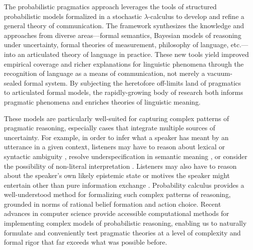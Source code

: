 \documentclass{sp}
\newcommand{\gcs}[1]{\textcolor{blue}{[gcs: #1]}}
\begin{document}
The probabilistic pragmatics approach leverages the tools of structured probabilistic models formalized in a stochastic $\lambda$-calculus to develop and refine a general theory of communication. The framework synthesizes the knowledge and approaches from diverse areas---formal semantics, Bayesian models of reasoning under uncertainty, formal theories of measurement, philosophy of language, etc.---into an articulated theory of language in practice. These new tools yield improved empirical coverage and richer explanations for linguistic phenomena through the recognition of language as a means of communication, not merely a vacuum-sealed formal system. By subjecting the heretofore off-limits land of pragmatics to articulated formal models, the rapidly-growing body of research both informs pragmatic phenomena and enriches theories of linguistic meaning.


These models are particularly well-suited for capturing complex patterns of pragmatic reasoning, especially cases that integrate multiple sources of uncertainty. For example, in order to infer what a speaker has meant by an utterance in a given context, listeners may have to reason about lexical or syntactic ambiguity \citep{bergenetal2016,savinellietal2017,FrankeBergen2020:Theory-driven-s}, resolve underspecification in semantic meaning \citep{lassitergoodman2013}, or consider the possibility of non-literal interpretation \citep{kaoetal2014metaphor,kaoetal2014}. Listeners may also have to reason about the speaker's own likely epistemic state \citep{goodmanstuhlmuller2013,scontrasgoodman2017,HerbstrittFranke2019:Complex-probabi} or motives the speaker might entertain other than pure information exchange \citep{yoonetal2016,yoonetal2017}. Probability calculus provides a well-understood method for formalizing such complex patterns of reasoning, grounded in norms of rational belief formation and action choice. Recent advances in computer science provide accessible computational methods for implementing complex models of probabilistic reasoning, enabling us to naturally formulate and conveniently test pragmatic theories at a level of complexity and formal rigor that far exceeds what was possible before.
\end{document}
